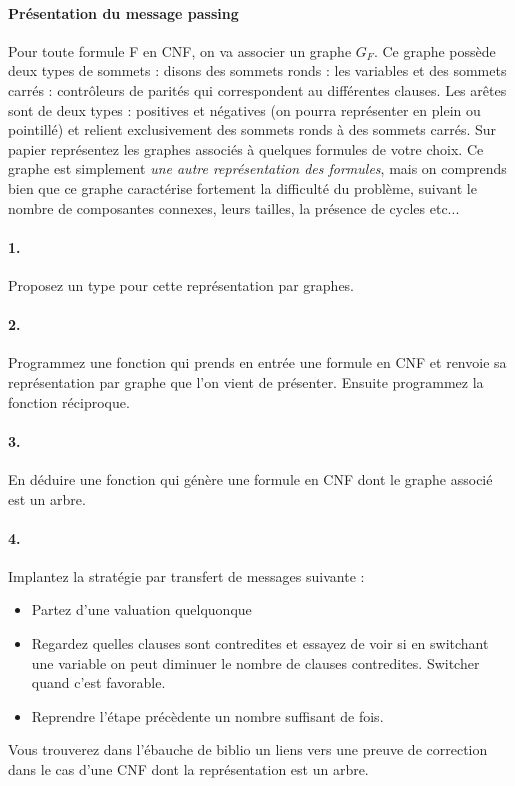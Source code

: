 \documentclass[10pt,a4paper]{article}
\begin{document}
\paragraph{Présentation du message passing} Pour toute formule F en CNF, on va associer un graphe $G_F$. Ce graphe possède deux types de sommets : disons des sommets ronds : les variables et des sommets carrés : contrôleurs de parités qui correspondent au différentes clauses. Les arêtes sont de deux types : positives et négatives (on pourra représenter en plein ou pointillé) et relient exclusivement des sommets ronds à des sommets carrés. Sur papier représentez les graphes associés à quelques formules de votre choix. Ce graphe est simplement \emph{une autre représentation des formules}, mais on comprends bien que ce graphe caractérise fortement la difficulté du problème, suivant le nombre de composantes connexes, leurs tailles, la présence de cycles etc... 

\paragraph{1.} Proposez un type pour cette représentation par graphes.

\paragraph{2.} Programmez une fonction qui prends en entrée une formule en CNF et renvoie sa représentation par graphe que l'on vient de présenter. Ensuite programmez la fonction réciproque. 

\paragraph{3.} En déduire une fonction qui génère une formule en CNF dont le graphe associé est un arbre.

\paragraph{4.} Implantez la stratégie par transfert de messages suivante : 
\begin{itemize}
\item Partez d'une valuation quelquonque
\item Regardez quelles clauses sont contredites et essayez de voir si en switchant une variable on peut diminuer le nombre de clauses contredites. Switcher quand c'est favorable.
\item Reprendre l'étape précèdente un nombre suffisant de fois. 
\end{itemize}
Vous trouverez dans l'ébauche de biblio un liens vers une preuve de correction dans le cas d'une CNF dont la représentation est un arbre.
\end{document}
